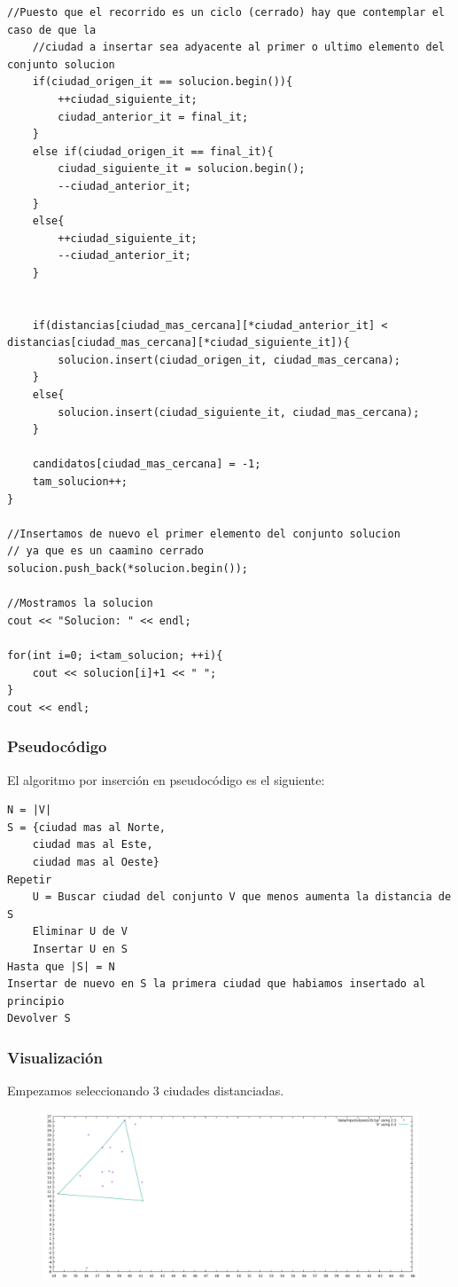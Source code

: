 \documentclass[11pt,a4paper]{article} %
\begin{document}
\begin{lstlisting}[style=C++]
	//Puesto que el recorrido es un ciclo (cerrado) hay que contemplar el caso de que la
	//ciudad a insertar sea adyacente al primer o ultimo elemento del conjunto solucion
	if(ciudad_origen_it == solucion.begin()){
		++ciudad_siguiente_it;
		ciudad_anterior_it = final_it;
	}
	else if(ciudad_origen_it == final_it){
		ciudad_siguiente_it = solucion.begin();
		--ciudad_anterior_it;
	}
	else{
		++ciudad_siguiente_it;
		--ciudad_anterior_it;
	}
	
	
	if(distancias[ciudad_mas_cercana][*ciudad_anterior_it] < distancias[ciudad_mas_cercana][*ciudad_siguiente_it]){
		solucion.insert(ciudad_origen_it, ciudad_mas_cercana);
	}
	else{
		solucion.insert(ciudad_siguiente_it, ciudad_mas_cercana);
	}
	
	candidatos[ciudad_mas_cercana] = -1;
	tam_solucion++;
}

//Insertamos de nuevo el primer elemento del conjunto solucion
// ya que es un caamino cerrado
solucion.push_back(*solucion.begin());

//Mostramos la solucion
cout << "Solucion: " << endl;

for(int i=0; i<tam_solucion; ++i){
	cout << solucion[i]+1 << " ";
}
cout << endl;
\end{lstlisting}

\subsubsection{Pseudocódigo}
El algoritmo por inserción en pseudocódigo es el siguiente:
\begin{lstlisting}
N = |V|
S = {ciudad mas al Norte, 
	ciudad mas al Este, 
	ciudad mas al Oeste}
Repetir
	U = Buscar ciudad del conjunto V que menos aumenta la distancia de S
	Eliminar U de V
	Insertar U en S
Hasta que |S| = N
Insertar de nuevo en S la primera ciudad que habiamos insertado al principio
Devolver S
\end{lstlisting}

\subsubsection{Visualización}
Empezamos seleccionando 3 ciudades distanciadas.
\begin{figure}[H]
	\centering
	\includegraphics[width=13cm]{data/graphics/insercion/insercion_1.pdf}
\end{figure}
\vspace{0,7cm}
\end{document}
